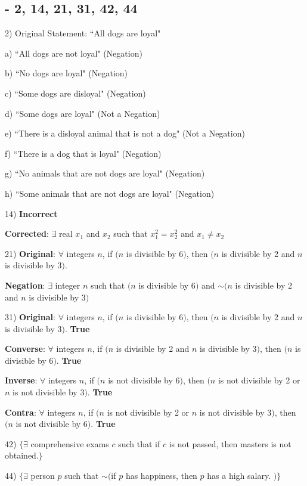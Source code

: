 \documentclass[11pt]{article}
\begin{document}
\subsection{ - 2, 14, 21, 31, 42, 44}
\begin{flushleft}
 2) Original Statement:  ``All dogs are loyal"
 
 a) ``All dogs are not loyal" (Negation)
 
 b) ``No dogs are loyal" (Negation)
 
 c) ``Some dogs are disloyal" (Negation)
 
 d) ``Some dogs are loyal" (Not a Negation)
 
 e) ``There is a disloyal animal that is not a dog" (Not a Negation)
 
 f) ``There is a dog that is loyal" (Negation)
 
 g) ``No animals that are not dogs are loyal" (Negation)
 
 h) ``Some animals that are not dogs are loyal" (Negation)
 
 
\hrulefill

14) \textbf{Incorrect}

\textbf{Corrected}: $\exists$ real $x_1$ and $x_2$ such that $x_1^2 = x_2^2$ and $x_1 \neq x_2$ 

\hrulefill

21) \textbf{Original}: $\forall$ integers $n$, if $(n$ is divisible by 6$)$, then $(n$ is divisible by 2 and $n$ is divisible by 3$)$.

\textbf{Negation}: $\exists$ integer $n$ such that $(n$ is divisible by 6$)$ and $\sim (n$ is divisible by 2 and $n$ is divisible by 3$)$

\hrulefill

31) \textbf{Original}: $\forall$ integers $n$, if $(n$ is divisible by 6$)$, then $(n$ is divisible by 2 and $n$ is divisible by 3$)$. \textbf{True}

\textbf{Converse}: $\forall$ integers $n$, if $(n$ is divisible by 2 and $n$ is divisible by 3$)$, then $(n$ is divisible by 6$)$. \textbf{True}

\textbf{Inverse}: $\forall$ integers $n$, if $(n$ is not divisible by 6$)$, then $(n$ is not divisible by 2 or $n$ is not divisible by 3$)$. \textbf{True}

\textbf{Contra}: $\forall$ integers $n$, if $(n$ is not divisible by 2 or $n$ is not divisible by 3$)$, then $(n$ is not divisible by 6$)$. \textbf{True}

\hrulefill

42) $\{ \exists$ comprehensive exams $c$ such that if $c$ is not passed, then masters is not obtained.$\}$

\hrulefill

44) $\{ \exists$ person $p$ such that $\sim ($if $p$ has happiness, then $p$ has a high salary. $)\}$

\hrulefill



\end{flushleft}
\end{document}
